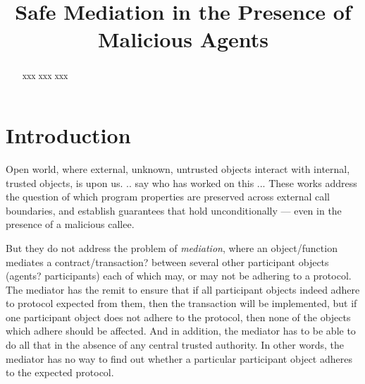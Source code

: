 \documentclass[acmsmall,review,anonymous,screen]{acmart}\settopmatter{printfolios=true,printacmref=false}
\begin{document}
\title{Safe Mediation in the Presence of Malicious Agents}
 



\begin{abstract}
xxx
xxx
xxx
\end{abstract}


\maketitle 




\section{Introduction}

Open world, where external, unknown, untrusted objects interact with internal, trusted objects, is upon us.
.. say who has worked on this ...
These works address the question of which program properties are preserved across external call boundaries, and 
establish guarantees that hold unconditionally — even in the presence of a malicious callee.

But they do not address the problem of \emph{mediation}, where  an object/function mediates a contract/transaction? between 
several other participant objects (agents? participants) each of which may, or may not be adhering to a protocol. 
The mediator has  the remit to ensure that if all participant objects indeed adhere to  protocol expected from them,  then the transaction 
will be implemented, 
but if one participant object does not adhere to the protocol, then none of the objects which adhere should be affected.
And in addition, the mediator has to be able to do all that in the absence of any central trusted authority.
In other words, the mediator has no way to find out whether a particular participant object adheres to the expected protocol.
\end{document}
